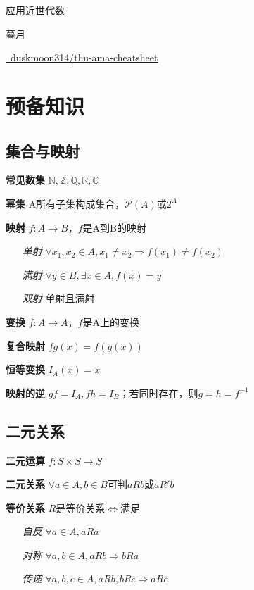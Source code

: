 \documentclass[a4paper,10pt]{ctexart}
\newcommand*{\setN}{\mathbb{N}}
\newcommand*{\setZ}{\mathbb{Z}}
\newcommand*{\setQ}{\mathbb{Q}}
\newcommand*{\setR}{\mathbb{R}}
\newcommand*{\setC}{\mathbb{C}}
\newcommand*{\powerset}[1]{\mathscr{P}(#1)}
\newcommand*{\impl}{\Rightarrow}
\renewcommand*{\iff}{\Leftrightarrow}
\begin{document}
\begin{multicols}{3}
    \begin{center}
        {\Large 应用近世代数}

        暮月

        \href{https://github.com/duskmoon314/thu-ama-cheatsheet}{\faGithub \  duskmoon314/thu-ama-cheatsheet}
    \end{center}

    \section{预备知识}

    \subsection{集合与映射}

    \textbf{常见数集} $\setN, \setZ, \setQ, \setR, \setC$

    \textbf{幂集} A所有子集构成集合，$\powerset{A}$或$2^A$

    \textbf{映射} $f: A \to B$，$f$是A到B的映射

    \begin{itemize}
        \item[\emph{单射}] $\forall x_1, x_2 \!\in\! A, x_1 \!\neq\! x_2 \!\impl\! f(x_1) \!\neq\! f(x_2) $
        \item[\emph{满射}] $\forall y \in B, \exists x \in A, f(x) = y$
        \item[\emph{双射}] 单射且满射
    \end{itemize}

    \textbf{变换} $f: A \to A$，$f$是A上的变换

    \textbf{复合映射} $fg(x) = f(g(x))$

    \textbf{恒等变换} $I_A(x) = x$

    \textbf{映射的逆} $gf=I_A, fh=I_B$；若同时存在，则$g=h=f^{-1}$

    \subsection{二元关系}

    \textbf{二元运算} $f: S \times S \to S$

    \textbf{二元关系} $\forall a \!\in\! A, b \!\in\! B$可判$\!aRb\!$或$\!aR'b\!$

    \textbf{等价关系} $R$是等价关系$\iff$满足

    \begin{itemize}
        \item[\emph{自反}] $\forall a \!\in\! A, aRa$
        \item[\emph{对称}] $\forall a, b \!\in\! A, aRb \impl bRa$
        \item[\emph{传递}] $\forall a, b, c \!\in\! A, aRb, bRc \impl aRc $
    \end{itemize}


\end{multicols}
\end{document}
